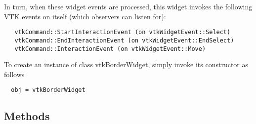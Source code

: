  In turn, when these widget events are processed, this widget invokes the
 following VTK events on itself (which observers can listen for):
 \begin{verbatim}
   vtkCommand::StartInteractionEvent (on vtkWidgetEvent::Select)
   vtkCommand::EndInteractionEvent (on vtkWidgetEvent::EndSelect)
   vtkCommand::InteractionEvent (on vtkWidgetEvent::Move)
 \end{verbatim}

To create an instance of class vtkBorderWidget, simply
invoke its constructor as follows
\begin{verbatim}
  obj = vtkBorderWidget
\end{verbatim}
\subsection{Methods}

